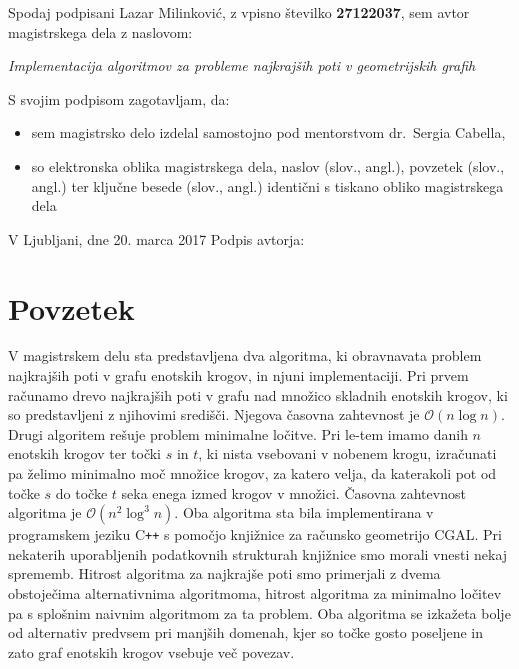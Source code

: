 \documentclass[a4paper, 12pt]{book}
\newcommand{\OO}{\ensuremath{\mathcal{O}}} %
\newcommand{\clearemptydoublepage}{\newpage{\pagestyle{empty}\cleardoublepage}}
\begin{document}
\vspace{1cm}
\noindent Spodaj podpisani Lazar Milinković,
z vpisno številko \textbf{27122037}, sem avtor magistrskega dela z naslovom:
   
\vspace{0.5cm}
\emph{Implementacija algoritmov za probleme najkrajših poti v geometrijskih grafih}

\vspace{1.5cm}
\noindent S svojim podpisom zagotavljam, da:
\begin{itemize}
	\item sem magistrsko delo izdelal samostojno pod mentorstvom 
		dr.\ Sergia Cabella,

	\item	so elektronska oblika magistrskega dela, naslov (slov., angl.), povzetek (slov., angl.) ter ključne besede (slov., angl.) identični s tiskano obliko magistrskega dela
\end{itemize}

\vspace{1cm}
\noindent V Ljubljani, dne 20. marca 2017 \hfill Podpis avtorja:

\clearemptydoublepage

\thispagestyle{empty}\mbox{}\vfill\null\it%
 
\rm\normalfont

\clearemptydoublepage


\def\thepage{}%
\tableofcontents{}


\clearemptydoublepage

\chapter*{Povzetek}
V magistrskem delu sta predstavljena dva algoritma, ki obravnavata problem najkrajših poti v grafu enotskih krogov, in njuni implementaciji. Pri prvem računamo drevo najkrajših poti v grafu nad množico skladnih enotskih krogov, ki so predstavljeni z njihovimi središči. Njegova časovna zahtevnost je $\OO(n\log n)$. Drugi algoritem rešuje problem minimalne ločitve. Pri le-tem imamo danih $n$ enotskih krogov ter točki $s$ in $t$, ki nista vsebovani v nobenem krogu, izračunati pa želimo minimalno moč množice krogov, za katero velja, da katerakoli pot od točke $s$ do točke $t$ seka enega izmed krogov v množici. Časovna zahtevnost algoritma je $\OO(n^2\log^3n)$. Oba algoritma sta bila implementirana v programskem jeziku C\texttt{+}\texttt{+} s pomočjo knjižnice za računsko geometrijo CGAL. Pri nekaterih uporabljenih podatkovnih strukturah knjižnice smo morali vnesti nekaj sprememb. Hitrost algoritma za najkrajše poti smo primerjali z dvema obstoječima alternativnima algoritmoma, hitrost algoritma za minimalno ločitev pa s splošnim naivnim algoritmom za ta problem. Oba algoritma se izkažeta bolje od alternativ predvsem pri manjših domenah, kjer so točke gosto poseljene in zato graf enotskih krogov vsebuje več povezav.
\bigbreak
\end{document}
